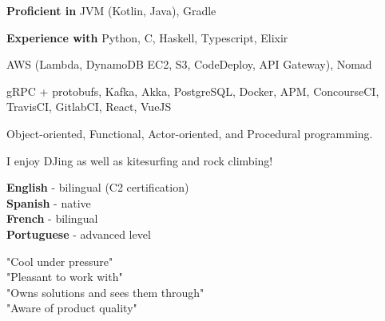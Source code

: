 \documentclass[9pt]{developercv}
\newcommand{\para}{\vspace{0.4em}}
\begin{document}
    \vspace{1em}
    \begin{minipage}[t]{0.62\textwidth}
        \vspace{-\baselineskip} %


        \vspace{-0.5em}
        \textbf{Proficient in} JVM (Kotlin, Java), Gradle

        \para
        \textbf{Experience with}
        Python, C, Haskell, Typescript, Elixir

        \para

        AWS (Lambda, DynamoDB EC2, S3, CodeDeploy, API Gateway), Nomad

        \para

        gRPC + protobufs, Kafka, Akka, PostgreSQL, Docker, APM, ConcourseCI, TravisCI, GitlabCI, React,
        VueJS

        \para

        Object-oriented, Functional, Actor-oriented, and Procedural programming.
        \\




        \vspace{-0.5em}
        I enjoy DJing as well as kitesurfing and rock climbing!
    \end{minipage}
    \hfill
    \begin{minipage}[t]{0.35\textwidth}
        \vspace{-\baselineskip} %

        \vspace{-0.5em}
        \textbf{English} - bilingual (C2 certification)\\
        \textbf{Spanish} - native\\
        \textbf{French} - bilingual\\
        \textbf{Portuguese} - advanced level\\


        \vspace{-0.5em}
        "Cool under pressure"\\
        "Pleasant to work with"\\
        "Owns solutions and sees them through"\\
        "Aware of product quality"
    \end{minipage}
    \vspace{1.2em}
    \hfill
%

\end{document}
